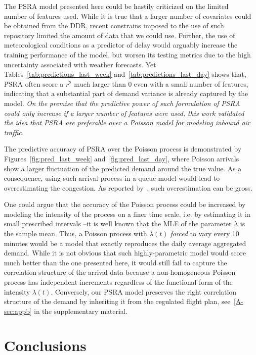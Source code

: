 \documentclass[draft,review]{elsarticle}
\makeatletter
\newcommand*{\ie}{i.e.\@\xspace}
\makeatother
\begin{document}
  The \ac{PSRA} model presented here could be hastily criticized on the limited number of features used.
  While it is true that a larger number of covariates could be obtained from the \ac{DDR}, recent constrains imposed to the use of such repository limited the amount of data that we could use.
  Further, the use of meteorological conditions as a predictor of delay would arguably increase the training performance of the model, but worsen its testing metrics due to the high uncertainty associated with weather forecasts.
  Yet Tables~\ref{tab:predictions_last_week} and~\ref{tab:predictions_last_day} shows that, \ac{PSRA} often score a \(r^2\) much larger than 0 even with a small number of features, indicating that a substantial part of demand variance is already captured by the model.
  \emph{On the premise that the predictive power of such formulation of \ac{PSRA} could only increase if a larger number of features were used, this work validated the idea that \ac{PSRA} are preferable over a Poisson model for modeling inbound air traffic.}

  The predictive accuracy of \ac{PSRA} over the Poisson process is demonstrated by Figures~\ref{fig:pred_last_week} and~\ref{fig:pred_last_day}, where Poisson arrivals show a larger fluctuation of the predicted demand around the true value.
  As a consequence, using such arrival process in a queue model would lead to overestimating the congestion.
  As reported by~\citet{caccavale2014model}, such overestimation can be gross.

  One could argue that the accuracy of the Poisson process could be increased by modeling the intensity of the process on a finer time scale, \ie{} by estimating it in small prescribed intervals --it is well known that the \ac{MLE} of the parameter \(\lambda\) is the sample mean.
  Thus, a Poisson process with \(\lambda(t)\) \emph{forced} to vary every 10 minutes would be a model that exactly reproduces the daily average aggregated demand.
  While it is not obvious that such highly-parametric model would score much better than the one presented here, it would still fail to capture the correlation structure of the arrival data because a non-homogeneous Poisson process has independent increments regardless of the functional form of the intensity \(\lambda(t)\).
  Conversely, our \ac{PSRA} model preserves the right correlation structure of the demand by inheriting it from the regulated flight plan, see~\ref{A-sec:appb} in the supplementary material.

\section{Conclusions}\label{sec:conclusions}
\end{document}
